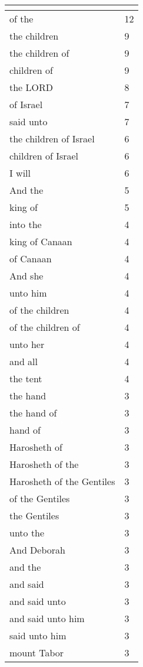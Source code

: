 \begin{center}
\begin{longtable}{|p{3.0in}|p{0.5in}|}
\hline \multicolumn{2}{c}{{ }} \\ \hline
\endfoot 
of the & 12\\ \hline 
the children & 9\\ \hline 
the children of & 9\\ \hline 
children of & 9\\ \hline 
the LORD & 8\\ \hline 
of Israel & 7\\ \hline 
said unto & 7\\ \hline 
the children of Israel & 6\\ \hline 
children of Israel & 6\\ \hline 
I will & 6\\ \hline 
And the & 5\\ \hline 
king of & 5\\ \hline 
into the & 4\\ \hline 
king of Canaan & 4\\ \hline 
of Canaan & 4\\ \hline 
And she & 4\\ \hline 
unto him & 4\\ \hline 
of the children & 4\\ \hline 
of the children of & 4\\ \hline 
unto her & 4\\ \hline 
and all & 4\\ \hline 
the tent & 4\\ \hline 
the hand & 3\\ \hline 
the hand of & 3\\ \hline 
hand of & 3\\ \hline 
Harosheth of & 3\\ \hline 
Harosheth of the & 3\\ \hline 
Harosheth of the Gentiles & 3\\ \hline 
of the Gentiles & 3\\ \hline 
the Gentiles & 3\\ \hline 
unto the & 3\\ \hline 
And Deborah & 3\\ \hline 
and the & 3\\ \hline 
and said & 3\\ \hline 
and said unto & 3\\ \hline 
and said unto him & 3\\ \hline 
said unto him & 3\\ \hline 
mount Tabor & 3\\ \hline 

\end{longtable}
\end{center}
